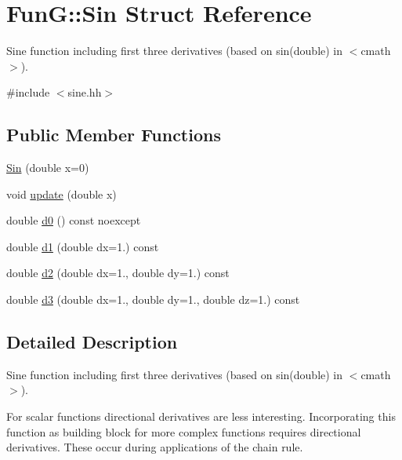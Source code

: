 \hypertarget{structFunG_1_1Sin}{\section{\-Fun\-G\-:\-:\-Sin \-Struct \-Reference}
\label{structFunG_1_1Sin}
}


\-Sine function including first three derivatives (based on sin(double) in $<$cmath$>$).  




{\ttfamily \#include $<$sine.\-hh$>$}

\subsection*{\-Public \-Member \-Functions}
\begin{DoxyCompactItemize}
\item 
\hyperlink{structFunG_1_1Sin_aa956d10238ebb30a8e037e9f82488a8e}{\-Sin} (double x=0)
\item 
void \hyperlink{structFunG_1_1Sin_a3f26e1664a29c03e2f29fc2205873850}{update} (double x)
\item 
double \hyperlink{structFunG_1_1Sin_abae046eecc58398c73f215087460586b}{d0} () const noexcept
\item 
double \hyperlink{structFunG_1_1Sin_aaef53b2343e2185e66ec4e9c0319ebdd}{d1} (double dx=1.) const 
\item 
double \hyperlink{structFunG_1_1Sin_ae0c92547f5da722f0fc642c2ea8f0539}{d2} (double dx=1., double dy=1.) const 
\item 
double \hyperlink{structFunG_1_1Sin_a8d8affa45264f36cde9db0bb1464934e}{d3} (double dx=1., double dy=1., double dz=1.) const 
\end{DoxyCompactItemize}


\subsection{\-Detailed \-Description}
\-Sine function including first three derivatives (based on sin(double) in $<$cmath$>$). 

\-For scalar functions directional derivatives are less interesting. \-Incorporating this function as building block for more complex functions requires directional derivatives. \-These occur during applications of the chain rule. 


